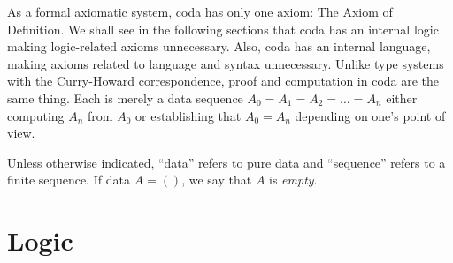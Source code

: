 \documentclass[11pt]{article}
\begin{document}
As a formal axiomatic system, coda has only one axiom: The Axiom of Definition.  We shall see in the following sections that coda has an internal logic making logic-related 
axioms unnecessary.  Also, coda has an internal language, making axioms related to language and syntax unnecessary.  Unlike type systems with the Curry-Howard 
correspondence, proof and computation in coda are the same thing.  Each is merely a data sequence $A_0=A_1=A_2=\dots=A_n$ either computing $A_n$ from $A_0$ or establishing 
that $A_0=A_n$ depending on one's point of view. 

Unless otherwise indicated, ``data'' refers to pure data and ``sequence'' refers to a finite sequence.  If data $A=()$, we say that $A$ is {\it empty}.  

\section{Logic}
\end{document}
